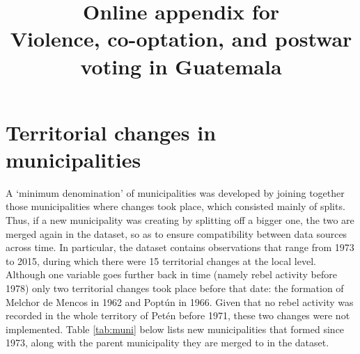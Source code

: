 \documentclass[a4paper, 12pt, notitlepage]{article}
\title{\Large Online appendix for\\Violence, co-optation, and postwar voting in Guatemala}
\author{}%
\date{}
\begin{document}
\maketitle

\tableofcontents


\clearpage
\section{Territorial changes in municipalities}\label{app:muni}

A `minimum denomination' of municipalities was developed by joining together those municipalities where changes took place, which consisted mainly of splits.
Thus, if a new municipality was creating by splitting off a bigger one, the two are merged again in the dataset, so as to ensure compatibility between data sources across time.
In particular, the dataset contains observations that range from 1973 to 2015, during which there were 15 territorial changes at the local level.
Although one variable goes further back in time (namely rebel activity before 1978) only two territorial changes took place before that date: the formation of Melchor de Mencos in 1962 and Poptún in 1966.%
Given that no rebel activity was recorded in the whole territory of Petén before 1971, these two changes were not implemented.
Table \ref{tab:muni} below lists new municipalities that formed since 1973, along with the parent municipality they are merged to in the dataset.
\end{document}
